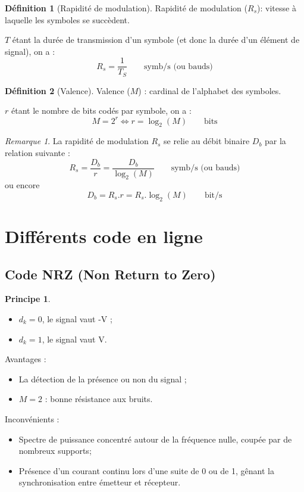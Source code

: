 \documentclass[11pt,english,french]{scrreprt}
\theoremstyle{remark}
\newtheorem*{rem*}{Remarque}
\theoremstyle{definition}
\newtheorem*{def*}{Définition}
\newtheorem*{princ*}{Principe}
\begin{document}
\begin{def*}[Rapidité de modulation]
	Rapidité de modulation ($R_s$): vitesse à laquelle les symboles se succèdent.
	
	$T$ étant la durée de transmission d'un symbole (et donc la durée d'un élément de signal), on a :
	\[
		R_s = \frac{1}{T_S}\qquad\textrm{symb/s (ou bauds)}
	\]
\end{def*}

\begin{def*}[Valence]
	Valence ($M$) : cardinal de l'alphabet des symboles.
	
	$r$ étant le nombre de bits codés par symbole, on a :
	\[
		M = 2^r \Leftrightarrow r= \log_2(M)\qquad\textrm{bits}
	\]
\end{def*}

\begin{rem*}
	La rapidité de modulation $R_s$ se relie au débit binaire $D_b$ par la relation suivante :
	\[
	 R_s = \frac{D_b}{r} = \frac{D_b}{\log_2(M)}\qquad\textrm{symb/s (ou bauds)}
	\]
	ou encore
	\[
		D_b = R_s.r = R_s.\log_2(M)\qquad\textrm{bit/s}
	\]
\end{rem*}

\section{Différents code en ligne} %

\subsection{Code NRZ (Non Return to Zero)} %

\begin{princ*}\hfill
	\begin{itemize}
		\item $d_k=0$, le signal vaut -V ;
		\item $d_k = 1$, le signal vaut V.
	\end{itemize}
\end{princ*}

Avantages :\begin{itemize}
	\item La détection de la présence ou non du signal ;
	\item $M = 2$ : bonne résistance aux bruits.
\end{itemize}
	          
Inconvénients :\begin{itemize}
	\item Spectre de puissance concentré autour de la fréquence nulle, coupée par de nombreux supports;
	\item Présence d'un courant continu lors d'une suite de 0 ou de 1, gênant la synchronisation entre émetteur et récepteur.
\end{itemize}
\end{document}
